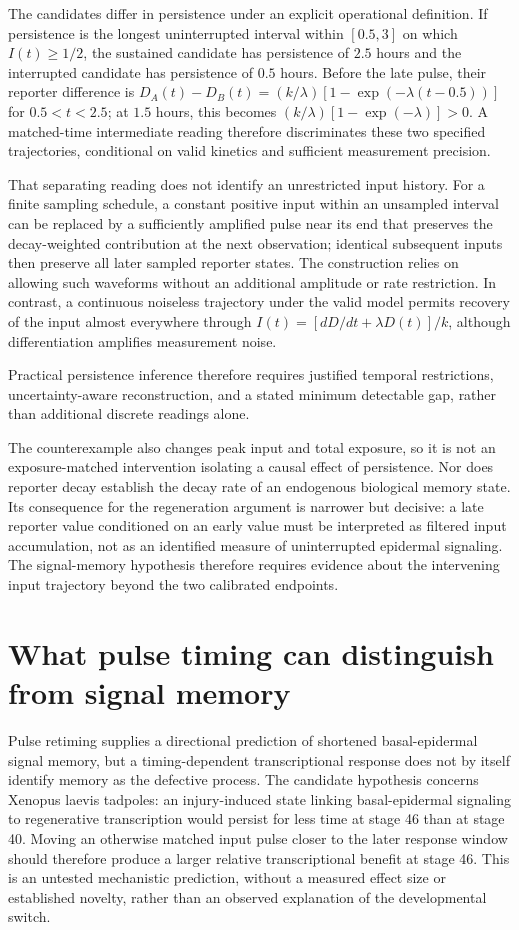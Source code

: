 \documentclass[11pt]{article}
\begin{document}
The candidates differ in persistence under an explicit operational definition. If persistence is the longest uninterrupted interval within $[0.5,3]$ on which $I(t)\geq1/2$, the sustained candidate has persistence of $2.5$ hours and the interrupted candidate has persistence of $0.5$ hours. Before the late pulse, their reporter difference is $D_A(t)-D_B(t)=(k/\lambda)[1-\exp(-\lambda(t-0.5))]$ for $0.5<t<2.5$; at $1.5$ hours, this becomes $(k/\lambda)[1-\exp(-\lambda)]>0$. A matched-time intermediate reading therefore discriminates these two specified trajectories, conditional on valid kinetics and sufficient measurement precision.

That separating reading does not identify an unrestricted input history. For a finite sampling schedule, a constant positive input within an unsampled interval can be replaced by a sufficiently amplified pulse near its end that preserves the decay-weighted contribution at the next observation; identical subsequent inputs then preserve all later sampled reporter states. The construction relies on allowing such waveforms without an additional amplitude or rate restriction. In contrast, a continuous noiseless trajectory under the valid model permits recovery of the input almost everywhere through $I(t)=[dD/dt+\lambda D(t)]/k$, although differentiation amplifies measurement noise.

Practical persistence inference therefore requires justified temporal restrictions, uncertainty-aware reconstruction, and a stated minimum detectable gap, rather than additional discrete readings alone.

The counterexample also changes peak input and total exposure, so it is not an exposure-matched intervention isolating a causal effect of persistence. Nor does reporter decay establish the decay rate of an endogenous biological memory state. Its consequence for the regeneration argument is narrower but decisive: a late reporter value conditioned on an early value must be interpreted as filtered input accumulation, not as an identified measure of uninterrupted epidermal signaling. The signal-memory hypothesis therefore requires evidence about the intervening input trajectory beyond the two calibrated endpoints.

\section{What pulse timing can distinguish from signal memory}
Pulse retiming supplies a directional prediction of shortened basal-epidermal signal memory, but a timing-dependent transcriptional response does not by itself identify memory as the defective process. The candidate hypothesis concerns Xenopus laevis tadpoles: an injury-induced state linking basal-epidermal signaling to regenerative transcription would persist for less time at stage 46 than at stage 40. Moving an otherwise matched input pulse closer to the later response window should therefore produce a larger relative transcriptional benefit at stage 46. This is an untested mechanistic prediction, without a measured effect size or established novelty, rather than an observed explanation of the developmental switch.
\end{document}
